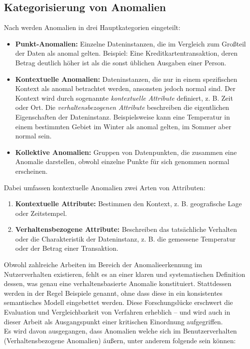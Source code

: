 \documentclass[a4paper,12pt]{article}
\begin{document}
	\subsection{Kategorisierung von Anomalien}
	Nach \cite{chandola2009anomaly} werden Anomalien in drei Hauptkategorien eingeteilt:
	
	\begin{itemize}
		\item \textbf{Punkt-Anomalien:} Einzelne Dateninstanzen, die im Vergleich zum Großteil der Daten als anomal gelten. Beispiel: Eine Kreditkartentransaktion, deren Betrag deutlich höher ist als die sonst üblichen Ausgaben einer Person.
		\item \textbf{Kontextuelle Anomalien:} Dateninstanzen, die nur in einem spezifischen Kontext als anomal betrachtet werden, ansonsten jedoch normal sind. Der Kontext wird durch sogenannte \emph{kontextuelle Attribute} definiert, z. B. Zeit oder Ort. Die \emph{verhaltensbezogenen Attribute} beschreiben die eigentlichen Eigenschaften der Dateninstanz. Beispielsweise kann eine Temperatur in einem bestimmten Gebiet im Winter als anomal gelten, im Sommer aber normal sein.
		\item \textbf{Kollektive Anomalien:} Gruppen von Datenpunkten, die zusammen eine Anomalie darstellen, obwohl einzelne Punkte für sich genommen normal erscheinen.
	\end{itemize}

	Dabei umfassen kontextuelle Anomalien zwei Arten von Attributen:
	
	\begin{enumerate}
		\item \textbf{Kontextuelle Attribute:} Bestimmen den Kontext, z. B. geografische Lage oder Zeitstempel.
		\item \textbf{Verhaltensbezogene Attribute:} Beschreiben das tatsächliche Verhalten oder die Charakteristik der Dateninstanz, z. B. die gemessene Temperatur oder der Betrag einer Transaktion.
	\end{enumerate}
	Obwohl zahlreiche Arbeiten im Bereich der Anomalieerkennung im Nutzerverhalten existieren, fehlt es an einer klaren und systematischen Definition dessen, was genau eine verhaltensbasierte Anomalie konstituiert. Stattdessen werden in der Regel Beispiele genannt, ohne dass diese in ein konsistentes semantisches Modell eingebettet werden. Diese Forschungslücke erschwert die Evaluation und Vergleichbarkeit von Verfahren erheblich – und wird auch in dieser Arbeit als Ausgangspunkt einer kritischen Einordnung aufgegriffen.
	\\[0.5em]
	Es wird davon ausgegangen, dass Anomalien welche sich im Benutzerverhalten (Verhaltensbezogene Anomalien) äußern, unter anderem folgende sein können:
	
\end{document}
